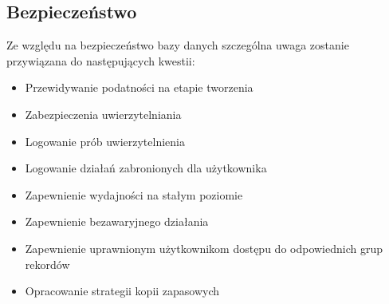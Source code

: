 \documentclass[10pt,a4paper,notitlepage]{article}
\begin{document}
\subsection{Bezpieczeństwo}
Ze względu na bezpieczeństwo bazy danych szczególna uwaga zostanie przywiązana do następujących kwestii:
\begin{itemize}
\item Przewidywanie podatności na etapie tworzenia
\item Zabezpieczenia uwierzytelniania
\item Logowanie prób uwierzytelnienia
\item Logowanie działań zabronionych dla użytkownika
\item Zapewnienie wydajności na stałym poziomie
\item Zapewnienie bezawaryjnego działania
\item Zapewnienie uprawnionym użytkownikom dostępu do odpowiednich grup rekordów
\item Opracowanie strategii kopii zapasowych
\end{itemize}
\end{document}
